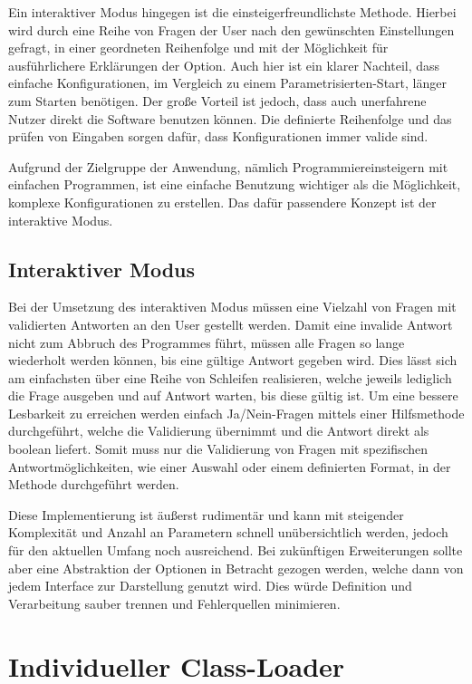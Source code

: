 Ein interaktiver Modus hingegen ist die einsteigerfreundlichste Methode. Hierbei wird durch eine Reihe von Fragen der User nach den gewünschten Einstellungen gefragt, in einer geordneten Reihenfolge und mit der Möglichkeit für ausführlichere Erklärungen der Option. Auch hier ist ein klarer Nachteil, dass einfache Konfigurationen, im Vergleich zu einem Parametrisierten-Start, länger zum Starten benötigen. Der große Vorteil ist jedoch, dass auch unerfahrene Nutzer direkt die Software benutzen können. Die definierte Reihenfolge und das prüfen von Eingaben sorgen dafür, dass Konfigurationen immer valide sind.

Aufgrund der Zielgruppe der Anwendung, nämlich Programmiereinsteigern mit einfachen Programmen, ist eine einfache Benutzung wichtiger als die Möglichkeit, komplexe Konfigurationen zu erstellen. Das dafür passendere Konzept ist der interaktive Modus.

\subsection{Interaktiver Modus}

Bei der Umsetzung des interaktiven Modus müssen eine Vielzahl von Fragen mit validierten Antworten an den User gestellt werden. Damit eine invalide Antwort nicht zum Abbruch des Programmes führt, müssen alle Fragen so lange wiederholt werden können, bis eine gültige Antwort gegeben wird. Dies lässt sich am einfachsten über eine Reihe von Schleifen realisieren, welche jeweils lediglich die Frage ausgeben und auf Antwort warten, bis diese gültig ist. Um eine bessere Lesbarkeit zu erreichen werden einfach Ja/Nein-Fragen mittels einer Hilfsmethode durchgeführt, welche die Validierung übernimmt und die Antwort direkt als boolean liefert. Somit muss nur die Validierung von Fragen mit spezifischen Antwortmöglichkeiten, wie einer Auswahl oder einem definierten Format, in der Methode durchgeführt werden.

Diese Implementierung ist äußerst rudimentär und kann mit steigender Komplexität und Anzahl an Parametern schnell unübersichtlich werden, jedoch für den aktuellen Umfang noch ausreichend.
Bei zukünftigen Erweiterungen sollte aber eine Abstraktion der Optionen in Betracht gezogen werden, welche dann von jedem Interface zur Darstellung genutzt wird. Dies würde Definition und Verarbeitung sauber trennen und Fehlerquellen minimieren.

\section{Individueller Class-Loader}


